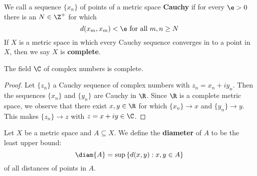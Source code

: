 \begin{definition}
    We call a sequence $\{x_n\}$ of points of a metric space \textbf{Cauchy} if
    for every $\e>0$ there is an  $N \in \Z^+$ for which
    \begin{equation*}
        d(x_m,x_m)<\e \text{ for all } m,n \geq N
    \end{equation*}
    If $X$ is a metric space in which every Cauchy sequence converges in to a
    point in $X$, then we say $X$ is  \textbf{complete}.
\end{definition}

\begin{theorem}\label{2.3.3}
    The field $\C$ of complex numbers is complete.
\end{theorem}
\begin{proof}
    Let $\{z_n\}$ a Cauchy sequence of complex numbers with $z_n=x_n+iy_n$.
    Then the sequences $\{x_n\}$ and $\{y_n\}$ are Cauchy in $\R$. Since $\R$ is
    a complete metric space, we observe that there exist $x,y \in \R$ for which
    $\{x_n\} \xrightarrow{} x$ and $\{y_n\} \xrightarrow{} y$. This makes
    $\{z_n\} \xrightarrow{} z$ with $z=x+iy \in \C$.
\end{proof}

\begin{definition}
    Let $X$ be a metric space and  $A \subseteq X$. We define the
    \textbf{diameter} of $A$ to be the least upper bound:
    \begin{equation*}
        \diam{A}=\sup{\{d(x,y) : x,y \in A\}}
    \end{equation*}
    of all distances of points in $A$.
\end{definition}

